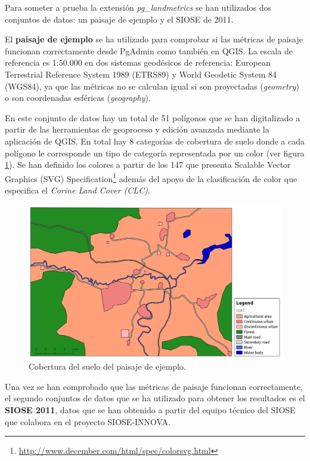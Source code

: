 Para someter a prueba la extensión \textit{pg\_landmetrics} se han utilizados dos conjuntos de datos: un paisaje de ejemplo y el SIOSE de 2011.

El \textbf{paisaje de ejemplo} se ha utilizado para comprobar si las métricas de paisaje funcionan correctamente desde PgAdmin como también en QGIS. La escala de referencia es 1:50.000 en dos sistemas geodésicos de referencia: European Terrestrial Reference System 1989 (ETRS89) y World Geodetic System 84 (WGS84), ya que las métricas no se calculan igual si son proyectadas (\textit{geometry}) o son coordenadas esféricas (\textit{geography}). 

En este conjunto de datos hay un total de 51 polígonos que se han digitalizado a partir de las herramientas de geoproceso y edición avanzada mediante la aplicación de QGIS. En total hay 8 categorías de cobertura de suelo donde a cada polígono le corresponde un tipo de categoría representada por un color (ver figura \ref{fig:zona_andrea}). Se han definido los colores a partir de los 147 que presenta Scalable Vector Graphics (SVG) Specification\footnote{\url{http://www.december.com/html/spec/colorsvg.html}} además del apoyo de la clasificación de color que especifica el \textit{Corine Land Cover (CLC)}.

\begin{figure}
\begin{center}
\includegraphics[width=\textwidth]{Metodologia/Figs/zona_andrea.png}
\caption{Cobertura del suelo del paisaje de ejemplo. \label{fig:zona_andrea}}
\end{center}
\end{figure}

Una vez se han comprobado que las métricas de paisaje funcionan correctamente, el segundo conjuntos de datos que se ha utilizado para obtener los resultados es el \textbf{SIOSE 2011}, datos que se han obtenido a partir del equipo técnico del SIOSE que colabora en el proyecto SIOSE-INNOVA. 

